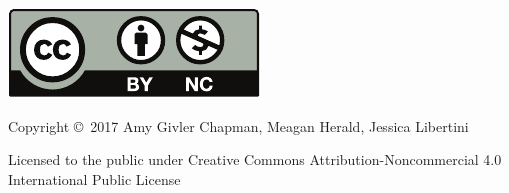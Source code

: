 \noindent\hskip -1in\begin{minipage}{2in}
\includegraphics{text/by-nc} 
\end{minipage}
\begin{minipage}{3in}
\noindent Copyright \copyright\ 2017 Amy Givler Chapman, Meagan Herald, Jessica Libertini

Licensed to the public under Creative Commons Attribution-Noncommercial 4.0 International Public License
\end{minipage}

